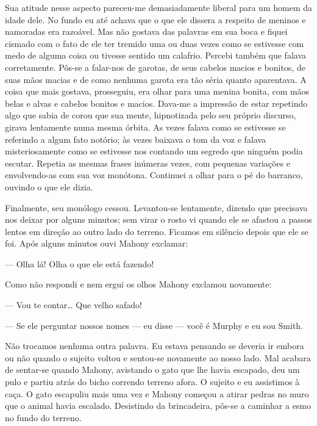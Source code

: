 Sua atitude nesse aspecto pareceu-me demasiadamente liberal para um
homem da idade dele. No fundo eu até achava que o que ele dissera a
respeito de meninos e namoradas era razoável. Mas não gostava das
palavras em sua boca e fiquei cismado com o fato de ele ter tremido
uma ou duas vezes como se estivesse com medo de alguma coisa ou
tivesse sentido um calafrio. Percebi também que falava corretamente.
Pôs-se a falar-nos de garotas, de seus cabelos macios e bonitos, de
suas mãos macias e de como nenhuma garota era tão séria quanto
aparentava. A coisa que mais gostava, prosseguiu, era olhar para uma
menina bonita, com mãos belas e alvas e cabelos bonitos e macios.
Dava-me a impressão de estar repetindo algo que sabia de corou que sua
mente, hipnotizada pelo seu próprio discurso, girava lentamente numa
mesma órbita. As vezes falava como se estivesse se referindo a algum
fato notório; às vezes baixava o tom da voz e falava misteriosamente
como se estivesse nos contando um segredo que ninguém podia
escutar. Repetia as mesmas frases inúmeras vezes, com pequenas
variações e envolvendo-as com sua voz monótona. Continuei a olhar para
o pé do barranco, ouvindo o que ele dizia.

Finalmente, seu monólogo cessou. Levantou-se lentamente, dizendo que
precisava nos deixar por alguns minutos; sem virar o rosto vi quando
ele se afastou a passos lentos em direção ao outro lado do terreno.
Ficamos em silêncio depois que ele se foi. Após alguns minutos ouvi
Mahony exclamar:

--- Olha lá! Olha o que ele está fazendo!

Como não respondi e nem ergui os olhos Mahony exclamou novamente:

--- Vou te contar\ldots{} Que velho safado!

--- Se ele perguntar nossos nomes --- eu disse --- você é Murphy e eu sou
Smith.

Não trocamos nenhuma outra palavra. Eu estava pensando se deveria ir
embora ou não quando o sujeito voltou e sentou-se novamente ao nosso
lado. Mal acabara de sentar-se quando Mahony, avistando o gato que lhe
havia escapado, deu um pulo e partiu atrás do bicho correndo terreno
afora. O sujeito e eu assistimos à caça. O gato escapuliu mais uma vez
e Mahony começou a atirar pedras no muro que o animal havia escalado.
Desistindo da brincadeira, pôs-se a caminhar a esmo no fundo do
terreno.

